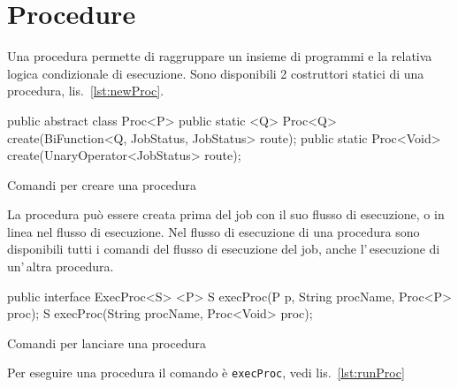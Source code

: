 \section{Procedure} \label{sec:proc}
Una procedura permette di raggruppare un insieme di programmi e la relativa
logica condizionale di esecuzione.
Sono disponibili 2 costruttori statici di una procedura, lis.~\ref{lst:newProc}.

\begin{elisting}[!htb]
\begin{javacode}
public abstract class Proc<P> {
    public static <Q> Proc<Q> create(BiFunction<Q, JobStatus, JobStatus> route);
    public static Proc<Void> create(UnaryOperator<JobStatus> route);
}
\end{javacode}
\caption{Comandi per creare una procedura}
\label{lst:newProc}
\end{elisting}

La procedura può essere creata prima del job con il suo flusso di esecuzione, o
in linea nel flusso di esecuzione.
Nel flusso di esecuzione di una procedura sono disponibili tutti i comandi del
flusso di esecuzione del job, anche l'\,esecuzione di un'\,altra procedura.

\begin{elisting}[!htb]
\begin{javacode}
public interface ExecProc<S> {
    <P> S execProc(P p, String procName, Proc<P> proc);
    S execProc(String procName, Proc<Void> proc);
}
\end{javacode}
\caption{Comandi per lanciare una procedura}
\label{lst:runProc}
\end{elisting}

Per eseguire una procedura il comando è \texttt{execProc}, vedi
lis.~\ref{lst:runProc}


